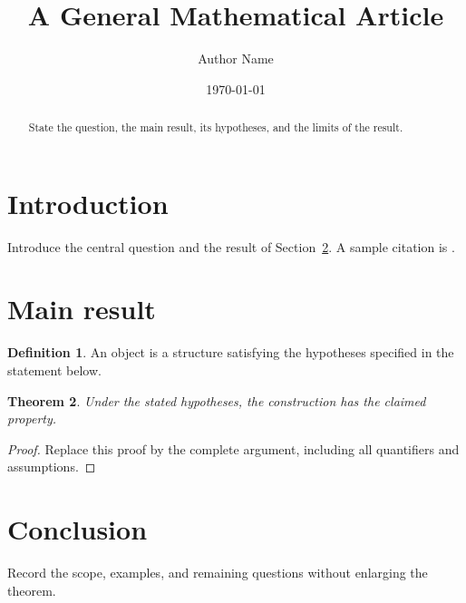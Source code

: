 \documentclass[11pt]{amsart}
\title{A General Mathematical Article}
\author{Author Name}
\date{\today}
\newtheorem{theorem}{Theorem}[section]
\theoremstyle{definition}
\newtheorem{definition}[theorem]{Definition}
\theoremstyle{remark}
\begin{document}
\begin{abstract}
State the question, the main result, its hypotheses, and the limits of the result.
\end{abstract}
\maketitle
\setcounter{tocdepth}{1}
\tableofcontents

\section{Introduction}\label{sec:introduction}
Introduce the central question and the result of Section~\ref{sec:main}. A sample citation is \cite{lamport}.

\section{Main result}\label{sec:main}
\begin{definition}
An object is a structure satisfying the hypotheses specified in the statement below.
\end{definition}

\begin{theorem}
Under the stated hypotheses, the construction has the claimed property.
\end{theorem}

\begin{proof}
Replace this proof by the complete argument, including all quantifiers and assumptions.
\end{proof}

\section{Conclusion}\label{sec:conclusion}
Record the scope, examples, and remaining questions without enlarging the theorem.



\end{document}
